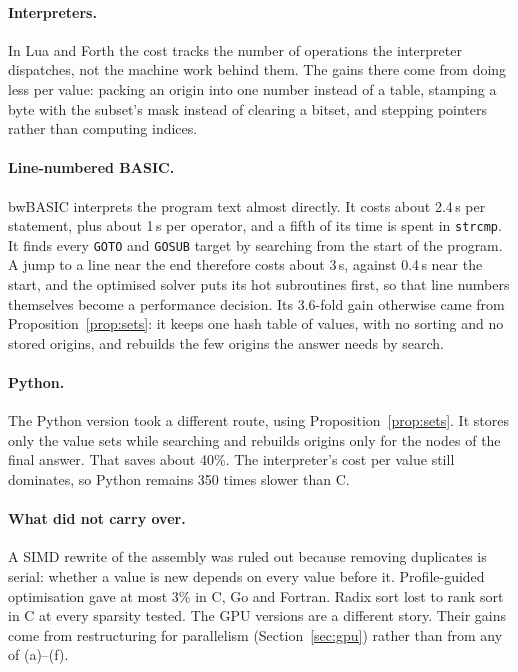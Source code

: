 \documentclass[11pt,a4paper]{article}
\theoremstyle{definition}
\theoremstyle{remark}
\begin{document}
\paragraph{Interpreters.}
In Lua and Forth the cost tracks the number of operations the interpreter dispatches, not the machine work
behind them. The gains there come from doing less per value: packing an origin into one number instead of a
table, stamping a byte with the subset's mask instead of clearing a bitset, and stepping pointers rather than
computing indices.

\paragraph{Line-numbered BASIC.}
bwBASIC interprets the program text almost directly. It costs about 2.4\,\textmu s per statement, plus about
1\,\textmu s per operator, and a fifth of its time is spent in \texttt{strcmp}. It finds every \texttt{GOTO} and
\texttt{GOSUB} target by searching from the start of the program. A jump to a line near the end therefore costs
about 3\,\textmu s, against 0.4\,\textmu s near the start, and the optimised solver puts its hot subroutines
first, so that line numbers themselves become a performance decision. Its 3.6-fold gain otherwise came from
Proposition~\ref{prop:sets}: it keeps one hash table of values, with no sorting and no stored origins, and
rebuilds the few origins the answer needs by search.

\paragraph{Python.}
The Python version took a different route, using Proposition~\ref{prop:sets}. It stores only the value sets while
searching and rebuilds origins only for the nodes of the final answer. That saves about 40\%. The interpreter's
cost per value still dominates, so Python remains 350 times slower than C.

\paragraph{What did not carry over.}
A SIMD rewrite of the assembly was ruled out because removing duplicates is serial: whether a value is new
depends on every value before it. Profile-guided optimisation gave at most 3\% in C, Go and Fortran. Radix sort
lost to rank sort in C at every sparsity tested. The GPU versions are a different story. Their gains come
from restructuring for parallelism (Section~\ref{sec:gpu}) rather than from any of (a)--(f).
\end{document}
